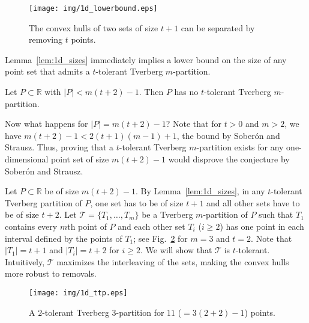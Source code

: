 \documentclass[oribibl,envcountsame,envcountsect]{llncs}
\newcommand{\mc}[1]{\ensuremath{\mathcal{#1}}}
\newcommand{\real}{\mathbb{R}}
\newcommand{\Soberon}{Sober\'{o}n}
\begin{document}
\begin{figure}[htbp]
  \begin{center}
    \texttt{[image: img/1d\_lowerbound.eps]}
  \end{center}
  \caption{The convex hulls of two sets of size $t+1$ can be separated by
    removing $t$ points.}
  \label{fig:1d_sizes}
\end{figure}

Lemma~\ref{lem:1d_sizes} immediately implies a lower bound on the size of any point set
that admits a $t$-tolerant Tverberg $m$-partition.

\begin{corollary}
  \label{ld:cor:lb}
  Let $P\subset \real$ with $|P| < m(t+2)-1$. Then $P$ has no $t$-tolerant
  Tverberg $m$-partition.
\end{corollary}

Now what happens for $|P| = m(t+2)-1$? Note that for $t > 0$ and $m > 2$, we
have $m(t+2) -1 < 2(t+1)(m-1) + 1$, the bound by \Soberon{} and Strausz.
Thus, proving that a $t$-tolerant Tverberg $m$-partition exists for any
one-dimensional point set of size $m(t+2)-1$ would disprove the conjecture by
\Soberon{} and Strausz.

Let $P\subset \real$ be of size $m(t+2)-1$. By Lemma~\ref{lem:1d_sizes}, in any
$t$-tolerant Tverberg partition of $P$, one set has to be of size $t+1$ and all
other sets have to be of size $t+2$. Let $\mc{T}=\{T_1,\ldots,T_m\}$ be
a Tverberg $m$-partition of $P$ such that $T_1$ contains every $m$th
point of $P$ and each other set $T_i$ ($i\geq 2$) has one point in each interval
defined by the points of $T_1$; see Fig.~\ref{ld:fig:ttp} for $m =3$ and $t=2$.
Note that $|T_1| = t+1$ and $|T_i| = t+2$ for $i\geq 2$.
We will show that $\mc{T}$ is $t$-tolerant.
Intuitively, $\mc{T}$
maximizes the interleaving of the sets, making the convex hulls more
robust to removals.

\begin{figure}[htbp]
  \begin{center}
    \texttt{[image: img/1d\_ttp.eps]}
  \end{center}
  \caption{A $2$-tolerant Tverberg $3$-partition for $11$ ($=3(2+2)-1$)
    points.}
  \label{ld:fig:ttp}
\end{figure}
\end{document}
